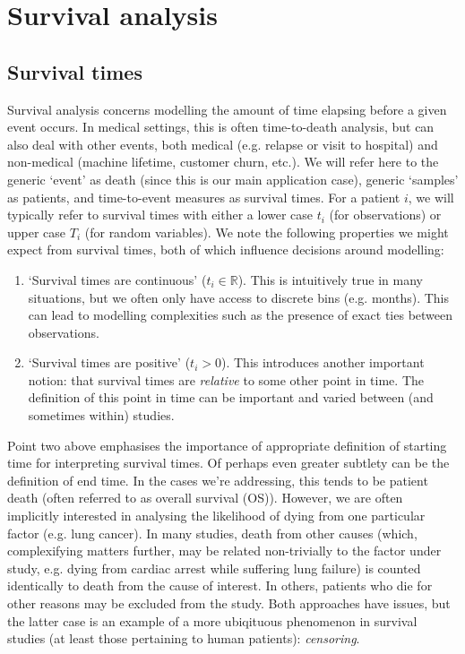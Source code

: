 \documentclass[../thesis.tex]{subfiles}
\begin{document}
\section{Survival analysis}

\subsection{Survival times}

Survival analysis concerns modelling the amount of time elapsing before a given event occurs. In medical settings, this is often time-to-death analysis, but can also deal with other events, both medical (e.g. relapse or visit to hospital) and non-medical (machine lifetime, customer churn, etc.). We will refer here to the generic `event' as death (since this is our main application case), generic `samples' as patients, and time-to-event measures as survival times. For a patient $i$, we will typically refer to survival times with either a lower case $t_i$ (for observations) or upper case $T_i$ (for random variables). We note the following properties we might expect from survival times, both of which influence decisions around modelling:
\begin{enumerate}
    \item `Survival times are continuous' ($t_i \in \mathbb{R}$). This is intuitively true in many situations, but we often only have access to discrete bins (e.g. months). This can lead to modelling complexities such as the presence of exact ties between observations.
    \item `Survival times are positive' ($t_i > 0$). This introduces another important notion: that survival times are \emph{relative} to some other point in time. The definition of this point in time can be important and varied between (and sometimes within) studies.
\end{enumerate}
Point two above emphasises the importance of appropriate definition of starting time for interpreting survival times. Of perhaps even greater subtlety can be the definition of end time. In the cases we're addressing, this tends to be patient death (often referred to as overall survival (OS)). However, we are often implicitly interested in analysing the likelihood of dying from one particular factor (e.g. lung cancer). In many studies, death from other causes (which, complexifying matters further, may be related non-trivially to the factor under study, e.g. dying from cardiac arrest while suffering lung failure) is counted identically to death from the cause of interest. In others, patients who die for other reasons may be excluded from the study. Both approaches have issues, but the latter case is an example of a more ubiqituous phenomenon in survival studies (at least those pertaining to human patients): \emph{censoring}.
\end{document}
